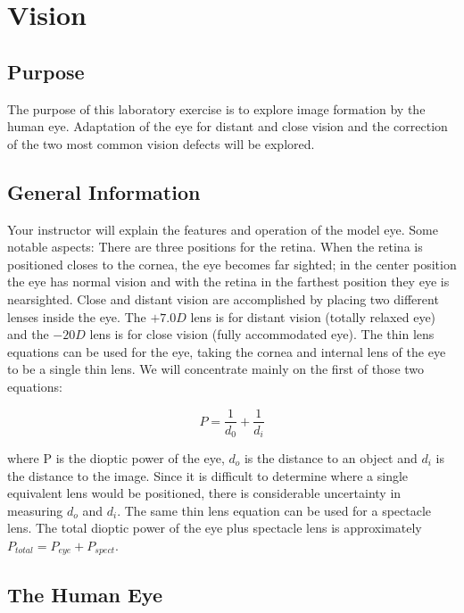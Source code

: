 \chapter{Vision}

\section{Purpose}
The purpose of this laboratory exercise is to explore image formation by the human eye. Adaptation of the eye for distant and close vision and the correction of the two most common vision defects will be explored.

\section{General Information}
Your instructor will explain the features and operation of the model eye. Some notable aspects: There are three positions for the retina. When the retina is positioned closes to the cornea, the eye becomes far sighted; in the center position the eye has normal vision and with the retina in the farthest position they eye is nearsighted. Close and distant vision are accomplished by placing two different lenses inside the eye. The $+7.0D$ lens is for distant vision (totally relaxed eye) and the $-20D$ lens is for close vision (fully accommodated eye).
The thin lens equations can be used for the eye, taking the cornea and internal lens of the eye to be a single thin lens. We will concentrate mainly on the first of those two equations:

\begin{equation}
	P = \frac{1}{d_0} + \frac{1}{d_i}
\end{equation}

\noindent where P is the dioptic power of the eye, $d_o$ is the distance to an object and $d_i$ is the distance to the image. Since it is difficult to determine where a single equivalent lens would be positioned, there is considerable uncertainty in measuring $d_o$ and $d_i$. The same thin lens equation can be used for a spectacle lens. The total dioptic power of the eye plus spectacle lens is approximately
	$P_{total} = P_{eye} + P_{spect}$.
	 
\section{The Human Eye}

